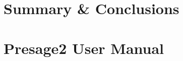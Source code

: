 \documentclass[ oneside,openright,titlepage,numbers=noenddot,headinclude,%
                footinclude=true,cleardoublepage=empty,abstractoff, %
                BCOR=5mm,paper=a4,fontsize=11pt,%
                english,%
                ]{scrreprt}
\begin{document}
\raggedbottom
\onehalfspacing
{} %
\pagestyle{plain}
%

%
\cleardoublepage
\cleardoublepage
\pagestyle{scrheadings}
\cleardoublepage
\cleardoublepage

%




\chapter{Summary \& Conclusions}
\cleardoublepage
\cleardoublepage

\appendix
\cleardoublepage
\chapter{Presage2 User Manual}

\end{document}
